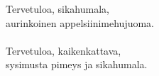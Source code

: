 
Tervetuloa, sikahumala, \\ aurinkoinen appelsiinimehujuoma. \\ \hspace{10mm} \\ Tervetuloa, kaikenkattava, \\ sysimusta pimeys ja sikahumala.